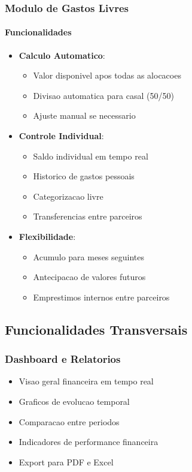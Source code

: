 \subsubsection{Modulo de Gastos Livres}

\paragraph{Funcionalidades}
\begin{itemize}
    \item \textbf{Calculo Automatico}:
    \begin{itemize}
        \item Valor disponivel apos todas as alocacoes
        \item Divisao automatica para casal (50/50)
        \item Ajuste manual se necessario
    \end{itemize}
    
    \item \textbf{Controle Individual}:
    \begin{itemize}
        \item Saldo individual em tempo real
        \item Historico de gastos pessoais
        \item Categorizacao livre
        \item Transferencias entre parceiros
    \end{itemize}
    
    \item \textbf{Flexibilidade}:
    \begin{itemize}
        \item Acumulo para meses seguintes
        \item Antecipacao de valores futuros
        \item Emprestimos internos entre parceiros
    \end{itemize}
\end{itemize}

\subsection{Funcionalidades Transversais}

\subsubsection{Dashboard e Relatorios}
\begin{itemize}
    \item Visao geral financeira em tempo real
    \item Graficos de evolucao temporal
    \item Comparacao entre periodos
    \item Indicadores de performance financeira
    \item Export para PDF e Excel
\end{itemize}

